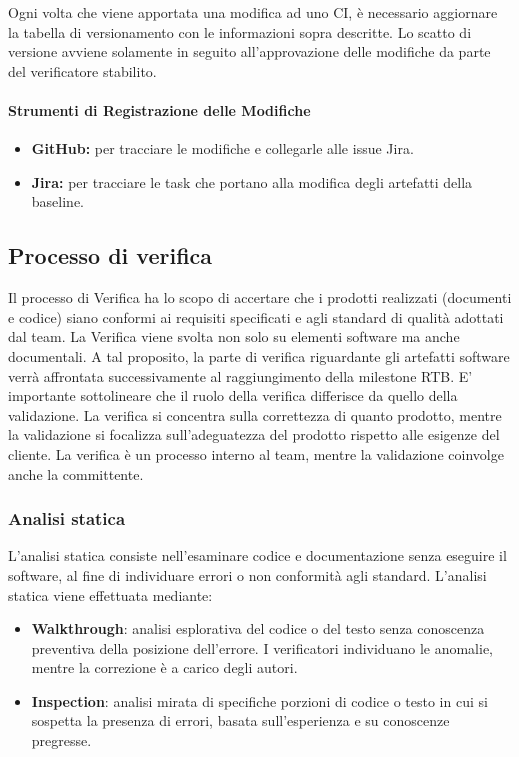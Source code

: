 \documentclass[a4paper,12pt]{article}
\begin{document}
Ogni volta che viene apportata una modifica ad uno CI, è necessario aggiornare la tabella di versionamento con le informazioni sopra descritte.
Lo scatto di versione avviene solamente in seguito all'approvazione delle modifiche da parte del verificatore stabilito.

\paragraph{Strumenti di Registrazione delle Modifiche}
\begin{itemize}
    \item \textbf{GitHub:} per tracciare le modifiche e collegarle alle issue Jira.
    \item \textbf{Jira:} per tracciare le task che portano alla modifica degli artefatti della baseline.
\end{itemize}

\subsection{Processo di verifica}
Il processo di Verifica ha lo scopo di accertare che i prodotti realizzati (documenti e codice) siano conformi ai requisiti specificati e agli standard di qualità adottati dal team.
La Verifica viene svolta non solo su elementi software ma anche documentali. A tal proposito, la parte di verifica riguardante gli artefatti software verrà
affrontata successivamente al raggiungimento della milestone RTB. E' importante sottolineare che il ruolo della verifica differisce da quello della validazione.
La verifica si concentra sulla correttezza di quanto prodotto, mentre la validazione si focalizza sull'adeguatezza del prodotto rispetto alle esigenze del cliente.
La verifica è un processo interno al team, mentre la validazione coinvolge anche la committente.

\subsubsection{Analisi statica}
L'analisi statica consiste nell'esaminare codice e documentazione senza eseguire il software, al fine di individuare errori o non conformità agli standard.
L'analisi statica viene effettuata mediante:
\begin{itemize}
    \item \textbf{Walkthrough}: analisi esplorativa del codice o del testo senza conoscenza preventiva della posizione dell'errore. I verificatori individuano le anomalie, mentre la correzione è a carico degli autori.
    
    \item \textbf{Inspection}: analisi mirata di specifiche porzioni di codice o testo in cui si sospetta la presenza di errori, basata sull'esperienza e su conoscenze pregresse.
\end{itemize}
\end{document}
